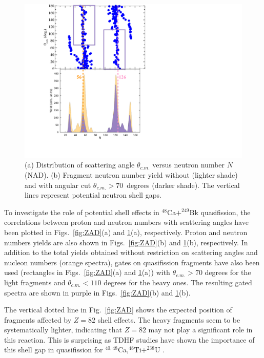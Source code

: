 \begin{figure}
	\centerline{\includegraphics*[width=\textwidth]{../Figures/CaBk/NAD.pdf}}
	\caption{(a) Distribution of scattering angle $\theta_{c.m.}$ versus neutron number $N$ (NAD). (b) Fragment neutron number yield without (lighter shade) and with angular cut $\theta_{c.m.}>70$~degrees (darker shade). The vertical lines represent potential neutron shell gaps.}
	\label{fig:NAD}
\end{figure}

To investigate the role of potential shell effects in $^{48}$Ca$+^{249}$Bk quasifission, the correlations between proton and neutron numbers with scattering angles have been plotted in Figs.~\ref{fig:ZAD}(a) and \ref{fig:NAD}(a), respectively.
Proton and neutron numbers yields are also shown in  Figs.~\ref{fig:ZAD}(b) and \ref{fig:NAD}(b), respectively.
In addition to the total yields obtained without restriction on scattering angles and nucleon numbers (orange spectra), gates on quasifission fragments have also been used (rectangles in Figs.~\ref{fig:ZAD}(a) and \ref{fig:NAD}(a)) with $\theta_{c.m.}>70$ degrees for the light fragments and $\theta_{c.m.}<110$ degrees for the heavy ones.
The resulting gated spectra are shown in purple in Figs.~\ref{fig:ZAD}(b) and \ref{fig:NAD}(b).

The vertical dotted line in Fig.~\ref{fig:ZAD} shows the expected position of fragments affected by $Z=82$ shell effects.
The heavy fragments seem to be systematically lighter, indicating that $Z=82$ may not play a significant role in this reaction.
This is surprising as TDHF studies have shown the importance of this shell gap in quasifission for $^{40,48}$Ca,$^{48}$Ti+$^{238}$U \citep{wakhle2014,oberacker2014,morjean2017}.

